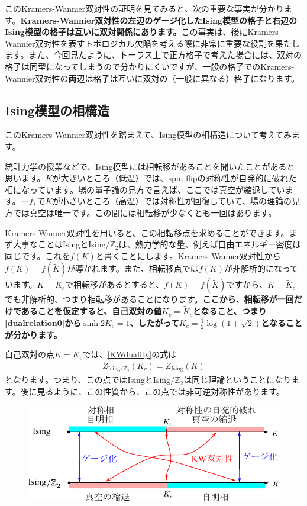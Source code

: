 \documentclass[report,paper=a4, fontsize=12pt, line_length=16cm, number_of_lines=33,dvipdfmx]{jlreq}
\newcommand{\kyou}[1]{{\sffamily \bfseries #1}}
\numberwithin{equation}{chapter}
\newcommand{\Zb}{\mathbb{Z}}
\newcommand{\ZIsing}{Z_{\mathrm{Ising}}}
\newcommand{\Zgauged}{Z_{\mathrm{Ising}/\Zb_2}}
\newcommand{\Kt}{\widetilde{K}}
\newcommand{\Ising}{\mbox{Ising}}
\newcommand{\gIsing}{\mbox{Ising$/\Zb_2$}}
\begin{document}
このKramers-Wannier双対性の証明を見てみると、次の重要な事実が分かります。\kyou{Kramers-Wannier双対性の左辺のゲージ化したIsing模型の格子と右辺のIsing模型の格子は互いに双対関係にあります。}この事実は、後にKramers-Wannier双対性を表すトポロジカル欠陥を考える際に非常に重要な役割を果たします。また、今回見たように、トーラス上で正方格子で考えた場合には、双対の格子は同型になってしまうので分かりにくいですが、一般の格子でのKramers-Wannier双対性の両辺は格子は互いに双対の（一般に異なる）格子になります。

\subsection{Ising模型の相構造}
このKramers-Wannier双対性を踏まえて、Ising模型の相構造について考えてみます。

統計力学の授業などで、Ising模型には相転移があることを聞いたことがあると思います。$K$が大きいところ（低温）では、spin flipの対称性が自発的に破れた相になっています。場の量子論の見方で言えば、ここでは真空が縮退しています。一方で$K$が小さいところ（高温）では対称性が回復していて、場の理論の見方では真空は唯一です。この間には相転移が少なくとも一回はあります。

Kramers-Wanner双対性を用いると、この相転移点を求めることができます。まず大事なことは\Ising と\gIsing は、熱力学的な量、例えば自由エネルギー密度は同じです。これを$f(K)$と書くことにします。Kramers-Wanner双対性から$f(K)=f(\Kt)$が導かれます。また、相転移点では$f(K)$が非解析的になっています。$K=K_c$で相転移があるとすると、$f(K)=f(\Kt)$ですから、$K=\Kt_c$でも非解析的、つまり相転移があることになります。\kyou{ここから、相転移が一回だけであることを仮定すると、自己双対の値$K_c=\Kt_c$となること、つまり\eqref{dualrelation0}から$\sinh 2K_c=1$、したがって$K_c=\frac12 \log  (1+\sqrt{2})$となることが分かります。}

自己双対の点$K=K_c$では、\eqref{KWduality}の式は
\begin{align}
  \Zgauged(K_c)=\ZIsing(K)
\end{align}
となります。つまり、この点では\Ising と\gIsing は同じ理論ということになります。後に見るように、この性質から、この点では非可逆対称性があります。


\begin{figure}
  \centering
  \includegraphics{isingphasestructure.pdf}
  \caption{}
  \label{fig:isingphasestructure}
\end{figure}
\end{document}
